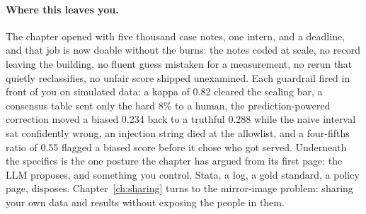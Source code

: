 \documentclass[
    a4paper,
    fontsize=10pt,
    twoside=true,
    numbers=noenddot,
]{kaobook}
\begin{document}
\paragraph{Where this leaves you.} The chapter opened with five thousand case notes, one intern, and a deadline, and that job is now doable without the burns: the notes coded at scale, no record leaving the building, no fluent guess mistaken for a measurement, no rerun that quietly reclassifies, no unfair score shipped unexamined. Each guardrail fired in front of you on simulated data: a kappa of 0.82 cleared the scaling bar, a consensus table sent only the hard 8\% to a human, the prediction-powered correction moved a biased 0.234 back to a truthful 0.288 while the naive interval sat confidently wrong, an injection string died at the allowlist, and a four-fifths ratio of 0.55 flagged a biased score before it chose who got served. Underneath the specifics is the one posture the chapter has argued from its first page: the LLM proposes, and something you control, Stata, a log, a gold standard, a policy page, disposes. Chapter~\ref{ch:sharing} turns to the mirror-image problem: sharing your own data and results without exposing the people in them.
\end{document}
